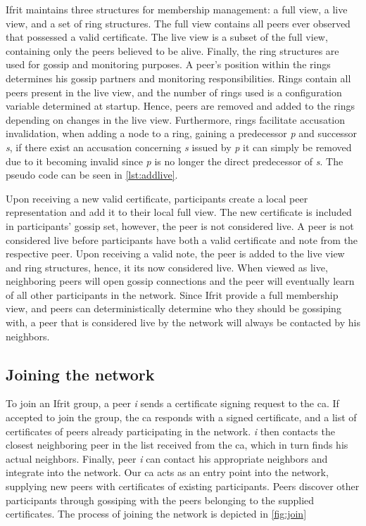 \documentclass[USenglish]{uit-thesis}
\begin{document}
Ifrit maintains three structures for membership management: a full view, a live view, and a set of ring structures.
The full view contains all peers ever observed that possessed a valid certificate.
The live view is a subset of the full view, containing only the peers believed to be alive.
Finally, the ring structures are used for gossip and monitoring purposes.
A peer's position within the rings determines his gossip partners and monitoring responsibilities.
Rings contain all peers present in the live view, and the number of rings used is a configuration variable determined at startup.
Hence, peers are removed and added to the rings depending on changes in the live view.
Furthermore, rings facilitate accusation invalidation, when adding a node to a ring, gaining a predecessor \textit{p} and successor \textit{s}, if there exist an accusation concerning \textit{s} issued by \textit{p} it can simply be removed due to it becoming invalid since \textit{p} is no longer the direct predecessor of \textit{s}.
The pseudo code can be seen in \autoref{lst:addlive}.

\begin{code}
\end{code}


Upon receiving a new valid certificate, participants create a local peer representation and add it to their local full view.
The new certificate is included in participants' gossip set, however, the peer is not considered live.
A peer is not considered live before participants have both a valid certificate and note from the respective peer.
Upon receiving a valid note, the peer is added to the live view and ring structures, hence, it its now considered live.
When viewed as live, neighboring peers will open gossip connections and the peer will eventually learn of all other participants in the network. 
Since Ifrit provide a full membership view, and peers can deterministically determine who they should be gossiping with, a peer that is considered live by the network will always be contacted by his neighbors.



\subsection{Joining the network}
To join an Ifrit group, a peer \textit{i} sends a certificate signing request to the \gls{ca}.
If accepted to join the group, the \gls{ca} responds with a signed certificate, and a list of certificates of peers already participating in the network.
\textit{i} then contacts the closest neighboring peer in the list received from the \gls{ca}, which in turn finds his actual neighbors.
Finally, peer \textit{i} can contact his appropriate neighbors and integrate into the network.
Our \gls{ca} acts as an entry point into the network, supplying new peers with certificates of existing participants.
Peers discover other participants through gossiping with the peers belonging to the supplied certificates.
The process of joining the network is depicted in \autoref{fig:join}
\end{document}
